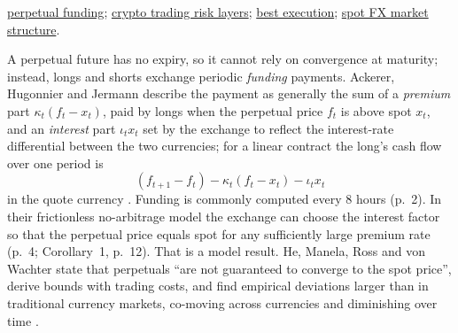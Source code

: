 \begin{qfdefinition}
 \hyperref[mech:perpetual-funding]{perpetual funding}; \hyperref[def:crypto-trading-risk-layers]{crypto trading risk layers}; \hyperref[def:best-execution]{best execution}; \hyperref[def:fx-market-structure]{spot FX market structure}.

\end{qfdefinition}

\begin{qfmechanism}\label{mech:perpetual-funding}
 A perpetual future has no expiry, so it cannot rely on convergence at maturity; instead, longs and shorts exchange periodic \emph{funding} payments. Ackerer, Hugonnier and Jermann describe the payment as generally the sum of a \emph{premium} part $\kappa_t(f_t-x_t)$, paid by longs when the perpetual price $f_t$ is above spot $x_t$, and an \emph{interest} part $\iota_t x_t$ set by the exchange to reflect the interest-rate differential between the two currencies; for a linear contract the long's cash flow over one period is
\[ (f_{t+1}-f_t)-\kappa_t(f_t-x_t)-\iota_t x_t \]
in the quote currency \citep[arXiv v2, sec.~3, pp.~7--8, eqs.~(4)--(6)]{roadmap-perpetual-pricing}. Funding is commonly computed every 8 hours (p.~2). In their frictionless no-arbitrage model the exchange can choose the interest factor so that the perpetual price equals spot for any sufficiently large premium rate (p.~4; Corollary~1, p.~12). That is a model result. He, Manela, Ross and von Wachter state that perpetuals ``are not guaranteed to converge to the spot price'', derive bounds with trading costs, and find empirical deviations larger than in traditional currency markets, co-moving across currencies and diminishing over time \citep[arXiv v7 of 17 September 2026, abstract]{roadmap-perpetual-fundamentals}.


\end{qfmechanism}

